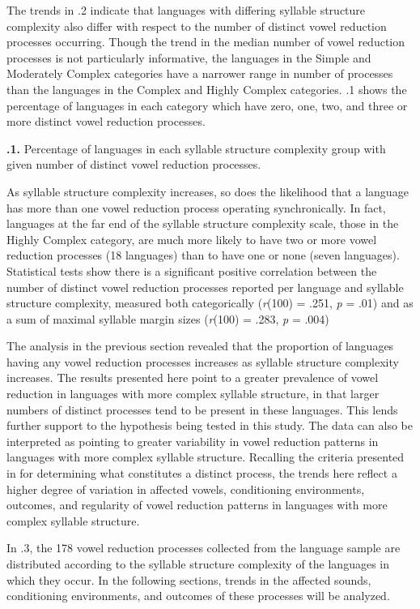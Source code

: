   The trends in .2 indicate that languages with differing syllable structure complexity also differ with respect to the number of distinct vowel reduction processes occurring. Though the trend in the median number of vowel reduction processes is not particularly informative, the languages in the Simple and Moderately Complex categories have a narrower range in number of processes than the languages in the Complex and Highly Complex categories. .1 shows the percentage of languages in each category which have zero, one, two, and three or more distinct vowel reduction processes.

\textbf{.1.} Percentage of languages in each syllable structure complexity group with given number of distinct vowel reduction processes.

  As syllable structure complexity increases, so does the likelihood that a language has more than one vowel reduction process operating synchronically. In fact, languages at the far end of the syllable structure complexity scale, those in the Highly Complex category, are much more likely to have two or more vowel reduction processes (18 languages) than to have one or none (seven languages). Statistical tests show there is a significant positive correlation between the number of distinct vowel reduction processes reported per language and syllable structure complexity, measured both categorically (\textit{r}(100) = .251, \textit{p} = .01) and as a sum of maximal syllable margin sizes (\textit{r}(100) = .283, \textit{p} = .004)

  The analysis in the previous section revealed that the proportion of languages having any vowel reduction processes increases as syllable structure complexity increases. The results presented here point to a greater prevalence of vowel reduction in languages with more complex syllable structure, in that larger numbers of distinct processes tend to be present in these languages. This lends further support to the hypothesis being tested in this study. The data can also be interpreted as pointing to greater variability in vowel reduction patterns in languages with more complex syllable structure. Recalling the criteria presented in  for determining what constitutes a distinct process, the trends here reflect a higher degree of variation in affected vowels, conditioning environments, outcomes, and regularity of vowel reduction patterns in languages with more complex syllable structure.

  In .3, the 178 vowel reduction processes collected from the language sample are distributed according to the syllable structure complexity of the languages in which they occur. In the following sections, trends in the affected sounds, conditioning environments, and outcomes of these processes will be analyzed.

